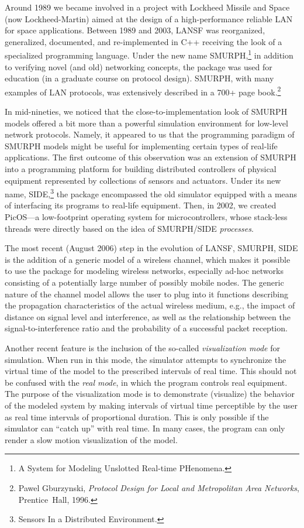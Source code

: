Around 1989 we became involved in a project with Lockheed Missile and Space
(now Lockheed-Martin) aimed at the design of a high-performance reliable
LAN for space applications.
Between 1989 and 2003, {\sc LANSF} was reorganized, generalized, documented, and
re-implemented in C++ receiving the look of a specialized programming
language.
Under the new name {\sc SMURPH},\footnote{A System
for Modeling Unslotted Real-time
PHenomena.}
in addition to verifying novel (and old) networking concepts,
the package was used for education (in a graduate course on
protocol design).
{\sc SMURPH}, with many examples of LAN protocols, was extensively described in
a 700+ page book.\footnote{Pawel Gburzynski,
{\em Protocol Design for Local and Metropolitan Area Networks},
Prentice~Hall, 1996.}

In mid-nineties, we noticed that the close-to-implementation look of
{\sc SMURPH}
models offered a bit more than a powerful simulation environment
for low-level network protocols.
Namely, it appeared to us that the programming paradigm of {\sc SMURPH} models 
might be useful for implementing certain types of real-life applications.
The first outcome of this observation was an extension of {\sc SMURPH} into a
programming platform for building distributed controllers of physical
equipment represented by collections of sensors and actuators.
Under its new name, {\sc SIDE},\footnote{Sensors In a Distributed Environment.}
the package encompassed the old simulator equipped with a means of interfacing
its programs to real-life equipment.
Then, in 2002, we created PicOS---a low-footprint operating system for
microcontrollers, whose stack-less threads were directly based on the idea of
{\sc SMURPH/SIDE} {\em processes}.

The most recent (August 2006)
step in the evolution of {\sc LANSF}, {\sc SMURPH}, {\sc SIDE} is the addition
of a generic model of a wireless channel, which makes it possible to use
the package for modeling wireless networks, especially ad-hoc networks
consisting of a potentially large number of possibly mobile nodes.
The generic nature of the channel model allows the user to plug into it
functions describing the propagation characteristics of the actual wireless
medium,
e.g., the impact of distance on signal level and interference,
as well as the relationship between the signal-to-interference ratio
and the probability of a successful packet reception.

Another recent feature is the inclusion of the so-called {\em visualization
mode\/} for simulation.
When run in this mode, the simulator attempts to synchronize the virtual time
of the model to the prescribed intervals of real time.
This should not be confused with the {\em real mode}, in which the program
controls real equipment.
The purpose of the visualization mode is to demonstrate (visualize)
the behavior of the modeled system by making intervals of virtual time
perceptible by the user as real time intervals of proportional
duration.
This is only possible if the simulator can ``catch up'' with real time.
In many cases, the program can only render a slow motion visualization of the
model.

